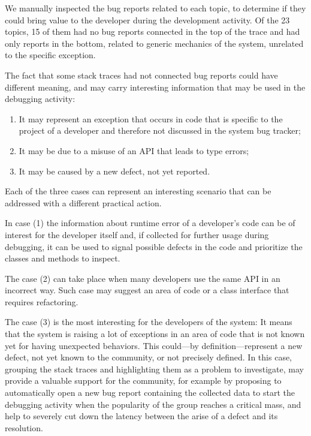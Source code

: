We manually inspected the bug reports related to each topic, to determine if they could bring value to the developer during the development activity. Of the 23 topics, 15 of them had no bug reports connected in the top of the trace and had only reports in the bottom, related to generic mechanics of the system, unrelated to the specific exception. 

The fact that some stack traces had not connected bug reports could have different meaning, and may carry interesting information that may be used in the debugging activity:

\begin{enumerate}%

\item It may represent an exception that occurs in code that is specific to the project of a developer and therefore not discussed in the system bug tracker;

\item It may be due to a misuse of an API that leads to type errors;

\item It may be caused by a new defect, not yet reported.

\end{enumerate}

Each of the three cases can represent an interesting scenario that can be addressed with a different practical action. 

In case (1) the information about runtime error of a developer's code can be of interest for the developer itself and, if collected for further usage during debugging, it can be used to signal possible defects in the code and prioritize the classes and methods to inspect. 

The case (2) can take place when many developers use the same API in an incorrect way. Such case may suggest an area of code or a class interface that requires refactoring.

The case (3) is the most interesting for the developers of the system: It means that the system is raising a lot of exceptions in an area of code that is not known yet for having unexpected behaviors. This could---by definition---represent a new defect, not yet known to the community, or not precisely defined. In this case, grouping the stack traces and highlighting them as a problem to investigate, may provide a valuable support for the community, for example by proposing to automatically open a new bug report containing the collected data to start the debugging activity when the popularity of the group reaches a critical mass, and help to severely cut down the latency between the arise of a defect and its resolution.

